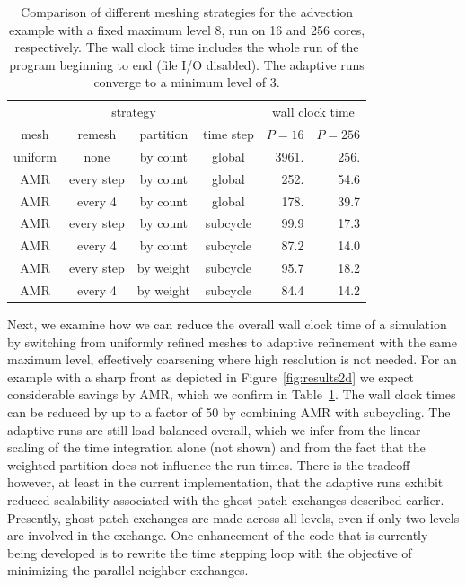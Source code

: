 \documentclass{IOS-Book-Article}     %
\newcommand{\Fig}[1]{Figure~\ref{fig:#1}}
\newcommand{\Tab}[1]{Table~\ref{tab:#1}}
\begin{document}
\begin{table}
  \begin{center}
    \begin{tabular}{cccc|rr}
      \multicolumn{4}{c|}{strategy} & \multicolumn{2}{c}{wall clock time} \\
      mesh & remesh & partition & time step & $P = 16$ & $P = 256$ \\
      \hline
      uniform & none       & by count  & global   & 3961.  & 256.  \\
      \hline
          AMR & every step & by count  & global   &  252.  &  54.6 \\
          AMR & every 4    & by count  & global   &  178.  &  39.7 \\
      \hline
          AMR & every step & by count  & subcycle &   99.9 &  17.3 \\
          AMR & every 4    & by count  & subcycle &   87.2 &  14.0 \\
      \hline
          AMR & every step & by weight & subcycle &   95.7 &  18.2 \\
          AMR & every 4    & by weight & subcycle &   84.4 & 14.2 \\
      \hline
    \end{tabular}
  \end{center}
\caption{Comparison of different meshing strategies for the advection example
  with a fixed maximum level 8, run on 16 and 256 cores, respectively.  The
  wall clock time includes the whole run of the program beginning to end (file
  I/O disabled).  The adaptive runs converge to a minimum level of 3.}
\label{tab:swirlwall}
\end{table}
Next, we examine how we can reduce the overall wall clock time of a simulation
by switching from uniformly refined meshes to adaptive refinement with the same maximum level,
effectively coarsening where high resolution is not needed.  For an example
with a sharp front as depicted in \Fig{results2d} we expect considerable
savings by AMR, which we confirm in \Tab{swirlwall}.  The wall clock times can
be reduced by up to a factor of 50 by combining AMR with subcycling.  The
adaptive runs are still  load balanced overall, which we infer from
the linear scaling of the time integration alone (not shown) and from the fact
that the weighted partition does not influence the run times.  There is the
tradeoff however, at least in the current implementation, that the adaptive
runs exhibit reduced scalability associated with the ghost patch exchanges
described earlier.  Presently, ghost patch exchanges are made across all levels, even
if only two levels are involved in the exchange.  One enhancement of the code that is
currently being developed is to rewrite the time stepping loop with the
objective of minimizing the parallel neighbor exchanges.
\end{document}
